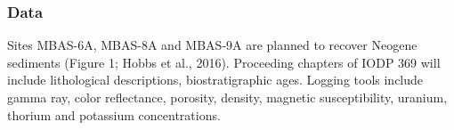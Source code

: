\subsubsection{Data}
Sites MBAS-6A, MBAS-8A and MBAS-9A are planned to recover Neogene sediments (Figure 1; Hobbs et al., 2016). Proceeding chapters of IODP 369 will include lithological descriptions, biostratigraphic ages. Logging tools include gamma ray, color reflectance, porosity, density, magnetic susceptibility, uranium, thorium and potassium concentrations.
